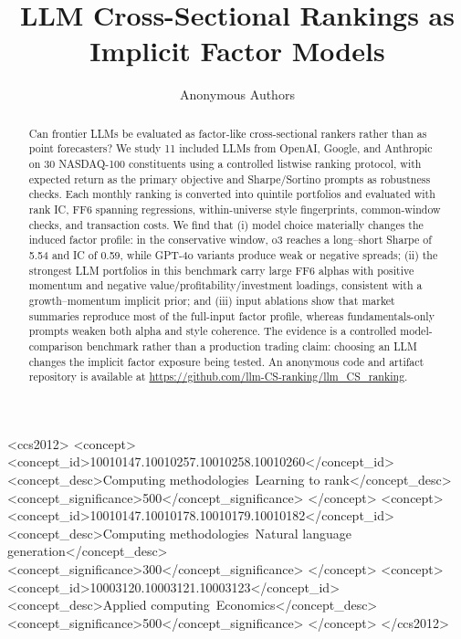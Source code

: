 \documentclass[sigconf, authoryear, nonacm]{acmart}
\title{LLM Cross-Sectional Rankings as Implicit Factor Models}
\author{Anonymous Authors}
\affiliation{%
  \institution{Anonymous Institution}
  \country{}
}
\begin{document}
\begin{abstract}
Can frontier LLMs be evaluated as factor-like cross-sectional rankers rather than as point forecasters?
We study 11 included LLMs from OpenAI, Google, and Anthropic on 30 NASDAQ-100 constituents using a controlled listwise ranking protocol, with expected return as the primary objective and Sharpe/Sortino prompts as robustness checks.
Each monthly ranking is converted into quintile portfolios and evaluated with rank IC, FF6 spanning regressions, within-universe style fingerprints, common-window checks, and transaction costs.
We find that (i) model choice materially changes the induced factor profile: in the conservative window, o3 reaches a long--short Sharpe of 5.54 and IC of 0.59, while GPT-4o variants produce weak or negative spreads;
(ii) the strongest LLM portfolios in this benchmark carry large FF6 alphas with positive momentum and negative value/profitability/investment loadings, consistent with a growth--momentum implicit prior;
and (iii) input ablations show that market summaries reproduce most of the full-input factor profile, whereas fundamentals-only prompts weaken both alpha and style coherence.
The evidence is a controlled model-comparison benchmark rather than a production trading claim: choosing an LLM changes the implicit factor exposure being tested.
An anonymous code and artifact repository is available at \url{https://github.com/llm-CS-ranking/llm_CS_ranking}.
\end{abstract}

\begin{CCSXML}
<ccs2012>
   <concept>
       <concept_id>10010147.10010257.10010258.10010260</concept_id>
       <concept_desc>Computing methodologies~Learning to rank</concept_desc>
       <concept_significance>500</concept_significance>
   </concept>
   <concept>
       <concept_id>10010147.10010178.10010179.10010182</concept_id>
       <concept_desc>Computing methodologies~Natural language generation</concept_desc>
       <concept_significance>300</concept_significance>
   </concept>
   <concept>
       <concept_id>10003120.10003121.10003123</concept_id>
       <concept_desc>Applied computing~Economics</concept_desc>
       <concept_significance>500</concept_significance>
   </concept>
</ccs2012>
\end{CCSXML}

\end{document}
